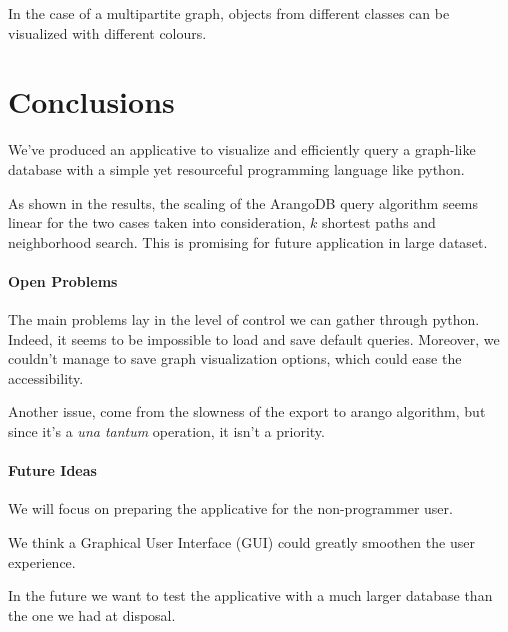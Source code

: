 \documentclass[11pt,twocolumn]{article}
\begin{document}
In the case of a multipartite graph, objects from different classes can be visualized with different colours.

\section{Conclusions}
\balance %
We've produced an applicative to visualize and efficiently query a graph-like database with a simple yet resourceful programming language like python.

As shown in the results, the scaling of the ArangoDB query algorithm seems linear for the two cases taken into consideration, $k$ shortest paths and neighborhood search. This is promising for future application in large dataset.

\paragraph{Open Problems}

The main problems lay in the level of control we can gather through python. Indeed, it seems to be impossible to load and save default queries.
Moreover, we couldn't manage to save graph visualization options, which could ease the accessibility.

Another issue, come from the slowness of the export to arango algorithm, but since it's a \textit{una tantum} operation, it isn't a priority.

\paragraph{Future Ideas}

We will focus on preparing the applicative for the non-programmer user.

We think a Graphical User Interface (GUI) could greatly smoothen the user experience.

In the future we want to test the applicative with a much larger database than the one we had at disposal.

\twocolumn[
\begin{@twocolumnfalse}


\end{@twocolumnfalse}
]
\end{document}
